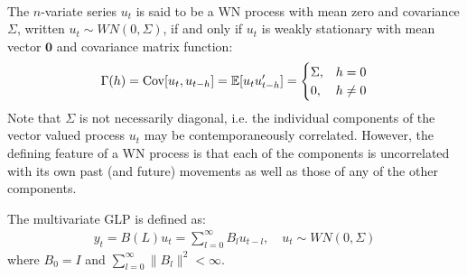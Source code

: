 \begin{definition}\label{def:multivariate-wn}
    \

    The $n$-variate series $u_t$ is said to be a WN process with mean zero and covariance $\Sigma$,
    written $u_t \sim WN(0, \Sigma)$,
    if and only if $u_t$ is weakly stationary with mean vector $\mathbf{0}$ and covariance matrix function:
    \begin{gather*}
        \Gamma(h) = \operatorname{Cov}[u_t, u_{t-h}] = \mathbb{E}[u_t u_{t-h}^{\prime}] = \begin{cases}
            \Sigma, & h=0 \\
            0, & h \neq 0
        \end{cases}
    \end{gather*}
    Note that $\Sigma$ is not necessarily diagonal, i.e. the individual components of the vector valued process $u_t$ may be contemporaneously correlated.
    However, the defining feature of a WN process is that each of the components is uncorrelated with its own past (and future) movements as well as those of any of the other components.
\end{definition}
The multivariate GLP is defined as:
\begin{gather*}
    y_t = B(L) u_t = \sum_{l=0}^{\infty} B_l u_{t-l}, \quad u_t \sim WN(0, \Sigma)
\end{gather*}
where $B_0 = I$ and $\sum_{l=0}^{\infty} \lVert B_l \rVert^2 < \infty.$

